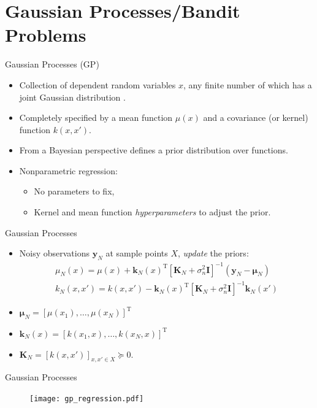 \documentclass[handout]{beamer}
\newcommand{\observations}{\mathbf{y}} %
\begin{document}
\section{Gaussian Processes/Bandit Problems}
%
\begin{frame}{Gaussian Processes (GP)}
\begin{itemize}
\item Collection of dependent random variables $x$, any finite number of which has a joint Gaussian distribution \cite{GPbook}. \pause
\item Completely specified by a mean function $\mu(x)$ and a covariance (or kernel) function $k(x,x')$. \pause
\item From a Bayesian perspective defines a prior distribution over functions. \pause
\item Nonparametric regression: \pause
	\begin{itemize}
	\item No parameters to fix, \pause
	\item Kernel and mean function \emph{hyperparameters} to adjust the prior.
	\end{itemize}
\end{itemize}
\end{frame}
%
\begin{frame}{Gaussian Processes}
\begin{itemize}
\item Noisy observations $\observations_{N}$ at sample points $X$, \emph{update} the priors: \pause
\begin{align}
\mu_N{(x)} = \mu(x) + \mathbf{k}_N(x)^{\mathrm{T}}[\mathbf{K}_N + \sigma_{n}^{2}\mathbf{I}]^{-1}(\observations_N - \boldsymbol{\mu}_N) \\
k_N(x,x') = k(x,x') - \mathbf{k}_N(x)^{\mathrm{T}}[\mathbf{K}_N + \sigma_{n}^{2}\mathbf{I}]^{-1} \mathbf{k}_N(x') 
\end{align} 
\pause	
\item $\boldsymbol{\mu}_N = [\mu(x_1),\ldots,\mu(x_N)]^\mathrm{T}$ \pause
\item $\mathbf{k}_N(x) = [k(x_1,x),\ldots,k(x_N,x)]^\mathrm{T}$ \pause 
\item $\mathbf{K}_N = [k(x,x')]_{x,x' \in X} \succeq 0.$ \pause
\end{itemize}
\end{frame}
%
\begin{frame}{Gaussian Processes}
\begin{figure}
\center
\texttt{[image: gp\_regression.pdf]}			
\end{figure}
\end{frame}
\end{document}
